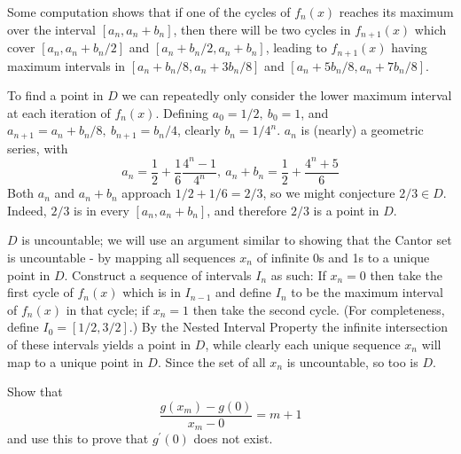 \begin{solution}
{Some computation shows that if one of the cycles of \(f_n(x)\) reaches its maximum over the interval \([a_n, a_n + b_n]\), then there will be two cycles in \(f_{n+1}(x)\) which cover \([a_n, a_n + b_n / 2]\) and \([a_n + b_n/2, a_n + b_n]\), leading to \(f_{n+1}(x)\) having maximum intervals in \([a_n + b_n/8, a_n + 3b_n/8]\) and \([a_n + 5b_n/8, a_n + 7b_n/8]\).

To find a point in \(D\) we can repeatedly only consider the lower maximum interval at each iteration of \(f_n(x)\). Defining \(a_0 = 1/2,\ b_0 = 1\), and \(a_{n+1} =a_n + b_n/8,\ b_{n+1} = b_n/4\), clearly \(b_n = 1/4^n\). \(a_n\) is (nearly) a geometric series, with
\[a_n = \frac{1}{2} + \frac{1}{6} \frac{4^n-1}{4^n},\ a_n + b_n = \frac{1}{2} + \frac{4^n + 5}{6}\]
Both \(a_n\) and \(a_n + b_n\) approach \(1/2 + 1/6 = 2/3\), so we might conjecture \(2/3 \in D\). Indeed, \(2/3\) is in every \([a_n, a_n + b_n]\), and therefore \(2/3\) is a point in \(D\).

\item \(D\) is uncountable; we will use an argument similar to showing that the Cantor set is uncountable - by mapping all sequences \(x_n\) of infinite 0s and 1s to a unique point in \(D\). Construct a sequence of intervals \(I_n\) as such: If \(x_n = 0\) then take the first cycle of \(f_n(x)\) which is in \(I_{n-1}\) and define \(I_n\) to be the maximum interval of \(f_n(x)\) in that cycle; if \(x_n = 1\) then take the second cycle. (For completeness, define \(I_0 = [1/2, 3/2]\).) By the Nested Interval Property the infinite intersection of these intervals yields a point in \(D\), while clearly each unique sequence \(x_n\) will map to a unique point in \(D\). Since the set of all \(x_n\) is uncountable, so too is \(D\). 

}
\end{solution}

\begin{exercise}
Show that
$$
\frac{g\left(x_{m}\right)-g(0)}{x_{m}-0}=m+1
$$
and use this to prove that $g^{\prime}(0)$ does not exist.
\end{exercise}

\begin{exercise}

\end{exercise}

